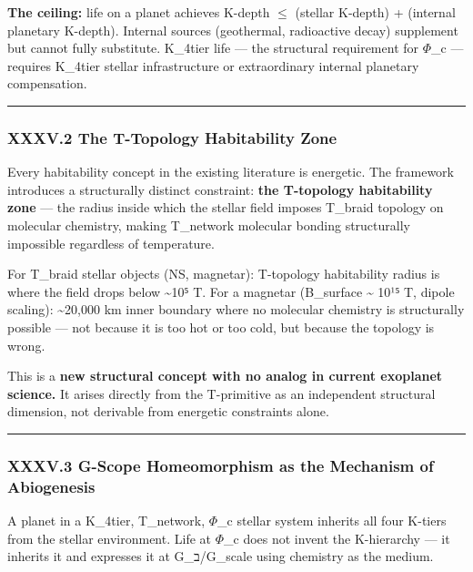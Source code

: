 \documentclass[12pt,a4paper]{article}
\begin{document}
\textbf{The ceiling:} life on a planet achieves K-depth $\leq$ (stellar K-depth) + (internal planetary K-depth). Internal sources (geothermal, radioactive decay) supplement but cannot fully substitute. K\_4tier life --- the structural requirement for $\Phi$\_c --- requires K\_4tier stellar infrastructure or extraordinary internal planetary compensation.

\begin{center}
\rule{0.5\textwidth}{0.4pt}
\end{center}

\subsubsection{XXXV.2 The T-Topology Habitability Zone}

Every habitability concept in the existing literature is energetic. The framework introduces a structurally distinct constraint: \textbf{the T-topology habitability zone} --- the radius inside which the stellar field imposes T\_braid topology on molecular chemistry, making T\_network molecular bonding structurally impossible regardless of temperature.

For T\_braid stellar objects (NS, magnetar): T-topology habitability radius is where the field drops below \textasciitilde{}10⁵ T. For a magnetar (B\_surface \textasciitilde{} 10¹⁵ T, dipole scaling): \textasciitilde{}20,000 km inner boundary where no molecular chemistry is structurally possible --- not because it is too hot or too cold, but because the topology is wrong.

This is a \textbf{new structural concept with no analog in current exoplanet science.} It arises directly from the T-primitive as an independent structural dimension, not derivable from energetic constraints alone.

\begin{center}
\rule{0.5\textwidth}{0.4pt}
\end{center}

\subsubsection{XXXV.3 G-Scope Homeomorphism as the Mechanism of Abiogenesis}

A planet in a K\_4tier, T\_network, $\Phi$\_c stellar system inherits all four K-tiers from the stellar environment. Life at $\Phi$\_c does not invent the K-hierarchy --- it inherits it and expresses it at G\_ב/G\_\zeta scale using chemistry as the medium.
\end{document}
